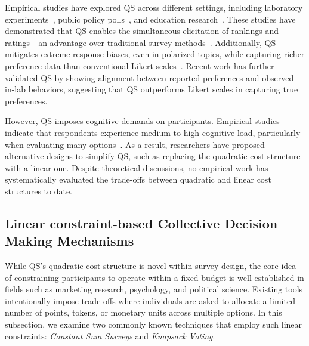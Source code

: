 Empirical studies have explored QS across different settings, including laboratory experiments~\cite{chengCanShowWhat2021,quarfoot2017quadratic}, public policy polls~\cite{cavaille2024cares, hollandDistributiveImpactsSupport2022}, and education research~\cite{naylor2017first}. These studies have demonstrated that QS enables the simultaneous elicitation of rankings and ratings---an advantage over traditional survey methods~\cite{chengCanShowWhat2021}. Additionally, QS mitigates extreme response biases, even in polarized topics, while capturing richer preference data than conventional Likert scales~\cite{quarfoot2017quadratic, cavaille2024cares, chengCanShowWhat2021, naylor2017first}. Recent work has further validated QS by showing alignment between reported preferences and observed in-lab behaviors, suggesting that QS outperforms Likert scales in capturing true preferences.

However, QS imposes cognitive demands on participants. Empirical studies indicate that respondents experience medium to high cognitive load, particularly when evaluating many options~\cite{cavaille2024cares, chengOrganizeThenVote2025}. As a result, researchers have proposed alternative designs to simplify QS, such as replacing the quadratic cost structure with a linear one. Despite theoretical discussions, no empirical work has systematically evaluated the trade-offs between quadratic and linear cost structures to date.

\subsection{Linear constraint-based Collective Decision Making Mechanisms}
\label{sec:related_works_force_choice}
While QS's quadratic cost structure is novel within survey design, the core idea of constraining participants to operate within a fixed budget is well established in fields such as marketing research, psychology, and political science. Existing tools intentionally impose trade-offs where individuals are asked to allocate a limited number of points, tokens, or monetary units across multiple options. In this subsection, we examine two commonly known techniques that employ such linear constraints: \textit{Constant Sum Surveys} and \textit{Knapsack Voting}.

